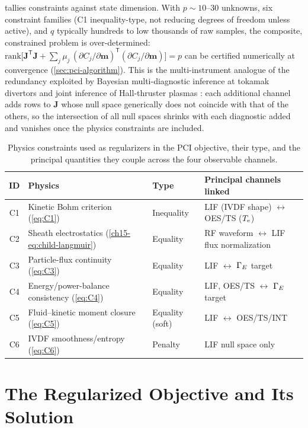  tallies constraints against state dimension. With $p\sim 10$--$30$ unknowns, six constraint families (C1 inequality-type, not reducing degrees of freedom unless active), and $q$ typically hundreds to low thousands of raw samples, the composite, constrained problem is over-determined: $\mathrm{rank}\big[\mathbf J^{\mathsf T}\mathbf J + \sum_{j}\mu_{j}\,(\partial C_{j}/\partial\mathbf m)^{\mathsf T}(\partial C_{j}/\partial\mathbf m)\big] = p$ can be certified numerically at convergence (\cref{sec:pci-algorithm}). This is the multi-instrument analogue of the redundancy exploited by Bayesian multi-diagnostic inference at tokamak divertors \cite{ref0685} and joint inference of Hall-thruster plasmas \cite{ref0719}: each additional channel adds rows to $\mathbf J$ whose null space generically does not coincide with that of the others, so the intersection of all null spaces shrinks with each diagnostic added and vanishes once the physics constraints are included.

\begin{table}[htbp]
\centering
\caption{Physics constraints used as regularizers in the PCI objective, their type, and the principal quantities they couple across the four observable channels.}
\label{tab:constraint-summary}
\begin{tabularx}{\textwidth}{@{}c l l X@{}}
\toprule
ID & Physics & Type & Principal channels linked \\
\midrule
C1 & Kinetic Bohm criterion (\cref{eq:C1}) & Inequality & LIF (IVDF shape) $\leftrightarrow$ OES/TS ($T_{\mathrm{e}}$) \\
C2 & Sheath electrostatics (\cref{ch15-eq:child-langmuir}) & Equality & RF waveform $\leftrightarrow$ LIF flux normalization \\
C3 & Particle-flux continuity (\cref{eq:C3}) & Equality & LIF $\leftrightarrow$ $\Gamma_{E}$ target \\
C4 & Energy/power-balance consistency (\cref{eq:C4}) & Equality & LIF, OES/TS $\leftrightarrow$ $\Gamma_{E}$ target \\
C5 & Fluid--kinetic moment closure (\cref{eq:C5}) & Equality (soft) & LIF $\leftrightarrow$ OES/TS/INT \\
C6 & IVDF smoothness/entropy (\cref{eq:C6}) & Penalty & LIF null space only \\
\bottomrule
\end{tabularx}
\end{table}

\section{The Regularized Objective and Its Solution}
\label{sec:pci-objective}

